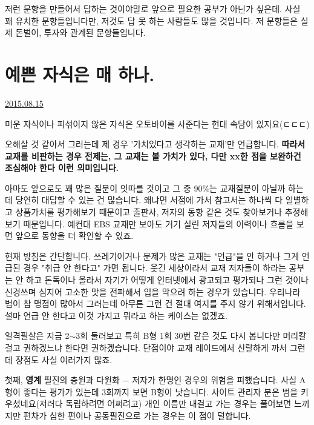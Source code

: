저런 문항을 만들어서 답하는 것이야말로 앞으로 필요한 공부가 아닌가 싶은데.
사실 꽤 유치한 문항들입니다만, 저것도 답 못 하는 사람들도 많을 것입니다.
저 문항들은 실제 돈벌이, 투자와 관계된 문항들입니다.
\vspace{5mm}






\section{예쁜 자식은 매 하나.}
\href{https://www.kockoc.com/Apoc/254570}{2015.08.15}

\vspace{5mm}

미운 자식이나 피섞이지 않은 자식은 오토바이를 사준다는 현대 속담이 있지요(ㄷㄷㄷ)
\vspace{5mm}

오해살 것 같아서 그러는데
제 경우 '가치있다고 생각하는 교재'만 언급합니다.
\textbf{따라서 교재를 비판하는 경우 전제는, 그 교재는 볼 가치가 있다, 다만 xx한 점을 보완하건 조심해야 한다 이런 의미입니다.}
\vspace{5mm}

아마도 앞으로도 꽤 많은 질문이 잇따를 것이고 그 중 90$\%$는 교재질문이 아닐까 하는데
당연히 대답할 수 있는 건 많습니다. 왜냐면 서점에 가서 참고서는 하나씩 다 일별하고 상품가치를 평가해보기 때문이고
출판사, 저자의 동향 같은 것도 찾아보거나 추정해보기 때문입니다.
예컨대 EBS 교재만 보아도 거기 실린 저자들의 이력이나 흐름을 보면 앞으로 동향을 더 확인할 수 있죠.
\vspace{5mm}

현재 방침은 간단합니다. 쓰레기이거나 문제가 많은 교재는 "언급"을 안 하거나 그게 언급된 경우 "취급 안 한다고" 가면 됩니다.
웃긴 세상이라서 교재 저자들이 하라는 공부는 안 하고 돈독이나 올라서 자기가 어떻게 인터넷에서 광고되고 평가되나 그런 것이나 신경쓰며
심지어 고소한 맛을 전파해서 입을 막으려 하는 경우가 있습니다.
우리나라 법이 참 맹점이 많아서 그러는데 아무튼 그런 건 절대 여지를 주지 않기 위해서입니다.
설마 언급 안 한다고 이것 가지고 뭐라고 하는 케이스는 없겠죠.
\vspace{5mm}

일격필살은 지금 2$\sim$3회 둘러보고 특히 B형 1회 30번 같은 것도 다시 봅니다만
머리칼 걸고 권하겠느냐 한다면 권하겠습니다.
단점이야 교재 레이드에서 신랄하게 까서 그런데 장점도 사실 여러가지 많죠.
\vspace{5mm}

첫째, \textbf{영계} 필진의 충원과 다원화 $-$ 저자가 한명인 경우의 위험을 피했습니다.
사실 A형이 좋다는 평가가 있는데 3회까지 보면 B형이 낫습니다. 사이트 관리자 분은 범을 키우셨네요(저러다 독립하려면 어쩌려고)
개인 이름만 내걸고 가는 경우는 풀어보면 느끼지만 편차가 심한 편이나 공동필진으로 가는 경우는 이 점이 덜합니다.
\vspace{5mm}

